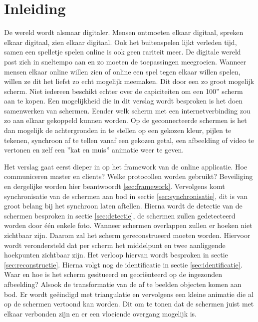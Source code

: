 \section{Inleiding}
De wereld wordt alsmaar digitaler. Mensen ontmoeten elkaar digitaal, spreken elkaar digitaal, zien elkaar digitaal. Ook het buitenspelen lijkt verleden tijd, samen een spelletje spelen online is ook geen rariteit meer. De digitale wereld past zich in sneltempo aan en zo moeten de toepassingen meegroeien. Wanneer mensen elkaar online willen zien of online een spel tegen elkaar willen spelen, willen ze dit het liefst zo echt mogelijk meemaken. Dit door een zo groot mogelijk scherm. Niet iedereen beschikt echter over de capiciteiten om een 100'' scherm aan te kopen. Een mogelijkheid die in dit verslag wordt besproken is het doen samenwerken van schermen. Eender welk scherm met een internetverbinding zou zo aan elkaar gekoppeld kunnen worden. Op de geconnecteerde schermen is het dan mogelijk de achtergronden in te stellen op een gekozen kleur, pijlen te tekenen, synchroon af te tellen vanaf een gekozen getal, een afbeelding of video te vertonen en zelf een ''kat en muis'' animatie weer te geven.

Het verslag gaat eerst dieper in op het framework van de online applicatie. Hoe communiceren master en clients? Welke  protocollen worden gebruikt? Beveiliging en dergelijke worden hier beantwoordt \ref{sec:framework}. Vervolgens komt synchronisatie van de schermen aan bod in sectie \ref{sec:synchronisatie}, dit is van groot belang bij het synchroon laten aftellen. Hierna wordt de detectie van de schermen besproken in sectie \ref{sec:detectie}, de schermen zullen gedetecteerd worden door één enkele foto. Wanneer schermen overlappen zullen er hoeken niet zichtbaar zijn. Daarom zal het scherm gereconstrueerd moeten worden. Hiervoor wordt verondersteld dat per scherm het middelpunt en twee aanliggende hoekpunten zichtbaar zijn. Het verloop hiervan wordt besproken in sectie \ref{sec:reconstructie}. Hierna volgt nog de identificatie in sectie \ref{sec:identificatie}. Waar en hoe is het scherm gesitueerd en georiënteerd op de ingezonden afbeelding? Alsook de transformatie van de af te beelden objecten komen aan bod. Er wordt geëindigd met triangulatie en vervolgens een kleine animatie die al op de schermen vertoond kan worden. Dit om te tonen dat de schermen juist met elkaar verbonden zijn en er een vloeiende overgang mogelijk is. 